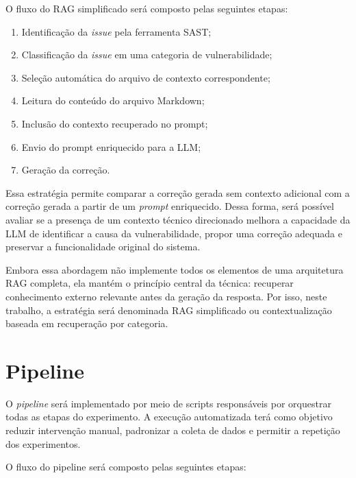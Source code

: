 O fluxo do RAG simplificado será composto pelas seguintes etapas:

\begin{enumerate}
    \item Identificação da \textit{issue} pela ferramenta SAST;
    \item Classificação da \textit{issue} em uma categoria de vulnerabilidade;
    \item Seleção automática do arquivo de contexto correspondente;
    \item Leitura do conteúdo do arquivo Markdown;
    \item Inclusão do contexto recuperado no prompt;
    \item Envio do prompt enriquecido para a LLM;
    \item Geração da correção.
\end{enumerate}

Essa estratégia permite comparar a correção gerada sem contexto adicional com a correção gerada a partir de um \textit{prompt} enriquecido. Dessa forma, será possível avaliar se a presença de um contexto técnico direcionado melhora a capacidade da LLM de identificar a causa da vulnerabilidade, propor uma correção adequada e preservar a funcionalidade original do sistema.

Embora essa abordagem não implemente todos os elementos de uma arquitetura RAG completa, ela mantém o princípio central da técnica: recuperar conhecimento externo relevante antes da geração da resposta. Por isso, neste trabalho, a estratégia será denominada RAG simplificado ou contextualização baseada em recuperação por categoria.

\section{Pipeline}

O \textit{pipeline} será implementado por meio de scripts responsáveis por orquestrar todas as etapas do experimento. A execução automatizada terá como objetivo reduzir intervenção manual, padronizar a coleta de dados e permitir a repetição dos experimentos.

O fluxo do pipeline será composto pelas seguintes etapas:

